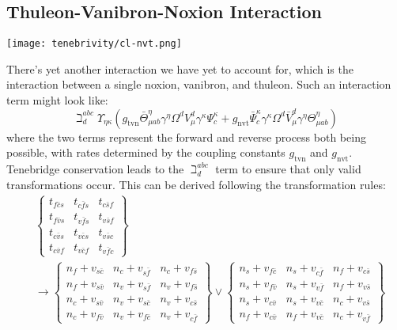 \subsection{Thuleon-Vanibron-Noxion Interaction}
\begin{center}
  \texttt{[image: tenebrivity/cl-nvt.png]}
\end{center}
There's yet another interaction we have yet to account for, which is the interaction between a single noxion, vanibron, and thuleon. Such an interaction term might look like:
\[
  \beth^{a b c}_{d} \Upsilon_{\eta \kappa} \left(
  g_{\text{tvn}}
  \bar{\Theta}^{\eta}_{\mu a b}
  \gamma^{\eta}
  \Omega^{d}
  V^{d}_{\mu}
  \gamma^{\kappa}
  \Psi^{\kappa}_{c}
  +
  g_{\text{nvt}}
  \bar{\Psi}^{\kappa}_{c}
  \gamma^{\kappa}
  \Omega^{d}
  \bar{V}^{d}_{\mu}
  \gamma^{\eta}
  \Theta^{\eta}_{\mu a b}
  \right)
\]
where the two terms represent the forward and reverse process both being possible, with rates determined by the coupling constants \(g_{\text{tvn}}\) and \(g_{\text{nvt}}\). Tenebridge conservation leads to the \(\beth^{a b c}_{d}\) term to ensure that only valid transformations occur. This can be derived following the transformation rules:
\begin{align*}
   & \begin{Bmatrix}
       t_{f \bar{c} s} & t_{c \bar{f} s} & t_{c \bar{s} f} \\
       t_{f \bar{v} s} & t_{v \bar{f} s} & t_{v \bar{s} f} \\
       t_{c \bar{v} s} & t_{v \bar{c} s} & t_{v \bar{s} c} \\
       t_{c \bar{v} f} & t_{v \bar{c} f} & t_{v \bar{f} c}
     \end{Bmatrix} \\
   & \longrightarrow
  \begin{Bmatrix}
    n_{f} + v_{s \bar{c}} & n_{c} + v_{s \bar{f}} & n_{c} + v_{f \bar{s}} \\
    n_{f} + v_{s \bar{v}} & n_{v} + v_{s \bar{f}} & n_{v} + v_{f \bar{s}} \\
    n_{c} + v_{s \bar{v}} & n_{v} + v_{s \bar{c}} & n_{v} + v_{c \bar{s}} \\
    n_{c} + v_{f \bar{v}} & n_{v} + v_{f \bar{c}} & n_{v} + v_{c \bar{f}}
  \end{Bmatrix} \lor
  \begin{Bmatrix}
    n_{s} + v_{f \bar{c}} & n_{s} + v_{c \bar{f}} & n_{f} + v_{c \bar{s}} \\
    n_{s} + v_{f \bar{v}} & n_{s} + v_{v \bar{f}} & n_{f} + v_{v \bar{s}} \\
    n_{s} + v_{c \bar{v}} & n_{s} + v_{v \bar{c}} & n_{c} + v_{v \bar{s}} \\
    n_{f} + v_{c \bar{v}} & n_{f} + v_{v \bar{c}} & n_{c} + v_{v \bar{f}}
  \end{Bmatrix}
\end{align*}


